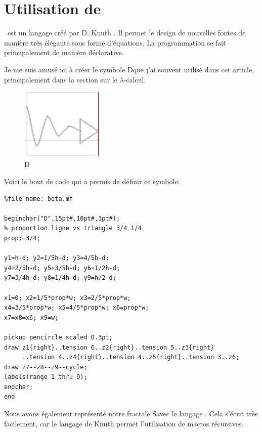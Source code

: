 \documentclass[11pt]{book}
\newcommand{\imp}{{\letterimp D}\hspace{0.1cm}}
\newcommand{\snow}{{\lettersnow S\hspace{0.2cm}}}
\begin{document}
\section{Utilisation de \MF}
\MF\ est un langage créé par D. Knuth \cite{mf}. Il permet le
design de nouvelles fontes de manière très élégante sous forme d'équations.
La programmation se fait principalement de manière déclarative.

Je me suis  amusé ici à créer le symbole  \imp que j'ai souvent
utilisé dans cet article, principalement dans la section sur le $\lambda$-calcul. 

\begin{figure}[H]
	\centering
	\caption{\imp}
	\includegraphics[width=4.0cm]{imp.png}
\end{figure}
Voici le bout de code qui a permis de définir ce symbole:
\begin{Verbatim}
%file name: beta.mf

beginchar("D",15pt#,10pt#,3pt#);
% proportion ligne vs triangle 3/4 1/4
prop:=3/4;

y1=h-d; y2=1/5h-d; y3=4/5h-d; 
y4=2/5h-d; y5=3/5h-d; y6=1/2h-d;  
y7=3/4h-d; y8=1/4h-d; y9=h/2-d;

x1=0; x2=1/5*prop*w; x3=2/5*prop*w;
x4=3/5*prop*w; x5=4/5*prop*w; x6=prop*w;
x7=x8=x6; x9=w;

pickup pencircle scaled 0.3pt;
draw z1{right}..tension 6..z2{right}..tension 5..z3{right}
     ..tension 4..z4{right}..tension 4..z5{right}..tension 3..z6;
draw z7--z8--z9--cycle; 
labels(range 1 thru 9);
endchar;
end
\end{Verbatim}

Nous avons également représenté notre fractale \snow avec le langage \MF .
Cela s'écrit très facilement, car le langage de Knuth permet l'utilisation
de macros récursives.
\end{document}
